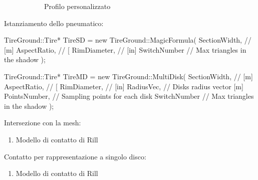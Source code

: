 \documentclass[xcolor=dvipsnames]{beamer} %
\begin{document}
\begin{frame}
\begin{figure}[h!]
\begin{subfigure}{.3\textwidth}
			\small{Profilo personalizzato}
		\end{subfigure}
		\hfill
	\end{figure}
\end{frame}

\begin{frame}[fragile]
	\Large{Istanziamento dello pneumatico}:
	\normalsize
\begin{pseudoc}
TireGround::Tire* TireSD = new TireGround::MagicFormula(
SectionWidth, // [m]
AspectRatio,  // [%
RimDiameter,  // [in]
SwitchNumber  // Max triangles in the shadow
);
\end{pseudoc}
\begin{pseudoc}
TireGround::Tire* TireMD = new TireGround::MultiDisk(
SectionWidth, // [m]
AspectRatio,  // [%
RimDiameter,  // [in]
RadiusVec,    // Disks radius vector [m]
PointsNumber, // Sampling points for each disk
SwitchNumber  // Max triangles in the shadow
);
\end{pseudoc}
\end{frame}

\begin{frame}
	\Large{Intersezione con la mesh}:
	\normalsize
	\begin{enumerate}
		\item Modello di contatto di Rill
	\end{enumerate}
\end{frame}

\begin{frame}
	\Large{Contatto per rappresentazione a singolo disco}:
	\normalsize
	\begin{enumerate}
		\item Modello di contatto di Rill
	\end{enumerate}
\end{frame}
\end{document}
